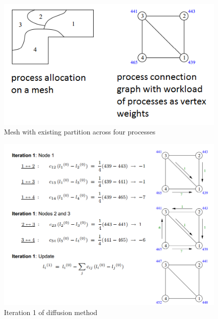 \documentclass{article}
\begin{document}
\begin{figure}[H]
	\centering
	\includegraphics[scale=0.5]{figures/diffusion-method-example1.png}
	\caption{Mesh with existing partition across four processes}
	\label{fig:diffusion-method-example}
\end{figure}

\begin{figure}[H]
	\centering
	\includegraphics[scale=0.5]{figures/diffusion-method-example2.png}
	\caption{Iteration 1 of diffusion method}
	\label{fig:diffusion-method-example2}
\end{figure}
\end{document}
